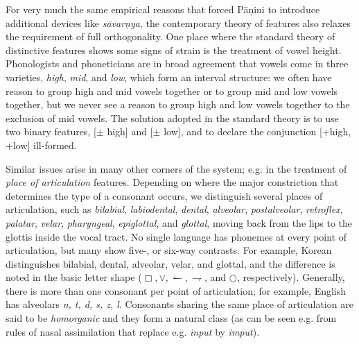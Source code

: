 For very much the same empirical reasons that forced P\={a}\d{n}ini to
introduce additional devices like {\it s\={a}var\d{n}ya}, the contemporary
theory of features also relaxes the requirement of full orthogonality.
 One place where the standard \cite{Chomsky:1968}
theory of distinctive features shows some signs of strain is the treatment of
vowel height. Phonologists and phoneticians are in broad agreement that vowels
come in three varieties, {\it high}, {\it mid}, and {\it low}, which form an
interval structure: we often have reason to group high and mid vowels together
or to group mid and low vowels together, but we never see a reason to group
high and low vowels together to the exclusion of mid vowels. The solution
adopted in the standard theory is to use two binary features, [$\pm$ high] and
[$\pm$ low], and to declare the conjunction [+high, +low] ill-formed.
   

Similar issues arise in many other corners of the system; e.g. in the
treatment of {\it place of articulation} features.
Depending on where the major constriction that determines the
type of a consonant occurs, we distinguish several places of articulation,
such as {\it bilabial}, {\it labiodental}, {\it dental}, {\it alveolar}, {\it
  postalveolar}, {\it retroflex}, {\it palatar}, {\it velar}, {\it
  pharyngeal}, {\it epiglottal}, and {\it glottal}, moving back from the lips
to the glottis inside the vocal tract. No single language has phonemes at
every point of articulation, but many show five-, or six-way contrasts. For
example, Korean distinguishes bilabial, dental, alveolar, velar, and glottal,
and the difference is noted in the basic letter shape ($\Box,
\vee,\leftharpoonup ,\rightharpoondown$, and $\bigcirc$,
respectively). Generally, there is more than one consonant per
point of articulation; for example, English has alveolars {\it n, t, d, s, z,
  l}. Consonants sharing the same place of articulation are said to be {\it
  homorganic} and they form a natural class (as can be seen e.g. from rules of
nasal assimilation that replace e.g. {\it input} by {\it
  imput}).

